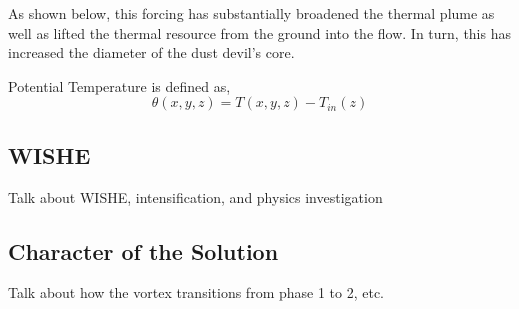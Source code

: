 As shown below, this forcing has substantially broadened the thermal
plume as well as lifted the thermal resource from the ground into the
flow. In turn, this has increased the diameter of the dust devil's
core. 

Potential Temperature is defined as,
\begin{equation}
  \theta(x,y,z) = T(x,y,z) -T_{in}(z) 
\end{equation}

%
%

\subsection{WISHE}

Talk about WISHE, intensification, and physics investigation

\subsection{Character of the Solution}

Talk about how the vortex transitions from phase 1 to 2, etc. 
